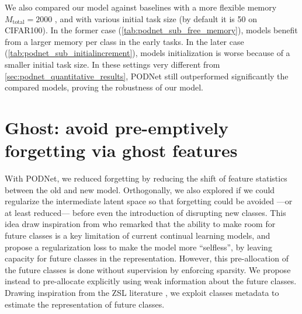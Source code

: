 We also compared our model against baselines with a more flexible memory $M_{\text{total}} = 2000$
\citep{rebuffi2017icarl,wu2019bias_correction}, and with various initial task size (by default it is
50 on CIFAR100). In the former case (\autoref{tab:podnet_sub_free_memory}), models benefit from a
larger memory per class in the early tasks. In the later case
(\autoref{tab:podnet_sub_initialincrement}), models initialization is worse because of a smaller
initial task size. In these settings very different from \autoref{sec:podnet_quantitative_results},
\ac{PODNet} still outperformed significantly the compared models, proving the robustness of our
model.






\FloatBarrier

\section{Ghost: avoid pre-emptively forgetting via ghost features}
\label{sec:ghost}

With PODNet, we reduced forgetting by reducing the shift of feature statistics between the old and
new model. Orthogonally, we also explored if we could regularize the intermediate latent space so
that forgetting could be avoided ---or at least reduced--- before even the introduction of
disrupting new classes. This idea draw inspiration from \cite{aljundi2019selfless} who remarked that
the ability to make room for future classes is a key limitation of current continual learning
models, and propose a regularization loss to make the model more “selfless”, by leaving capacity for
future classes in the representation. However, this pre-allocation of the future classes is done
without supervision by enforcing sparsity. We propose instead to pre-allocate explicitly using weak
information about the future classes. Drawing inspiration from the \acf{ZSL} literature
\citep{lampert2009zeroshot}, we exploit classes metadata to estimate the representation of future
classes.

